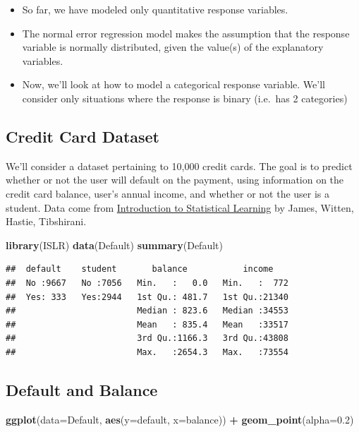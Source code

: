 \documentclass[]{book}
\newenvironment{Shaded}{\begin{snugshade}}{\end{snugshade}}
\newcommand{\KeywordTok}[1]{\textcolor[rgb]{0.13,0.29,0.53}{\textbf{#1}}}
\newcommand{\DataTypeTok}[1]{\textcolor[rgb]{0.13,0.29,0.53}{#1}}
\newcommand{\FloatTok}[1]{\textcolor[rgb]{0.00,0.00,0.81}{#1}}
\newcommand{\StringTok}[1]{\textcolor[rgb]{0.31,0.60,0.02}{#1}}
\newcommand{\OperatorTok}[1]{\textcolor[rgb]{0.81,0.36,0.00}{\textbf{#1}}}
\newcommand{\NormalTok}[1]{#1}
\begin{document}
\begin{itemize}
\item
  So far, we have modeled only quantitative response variables.
\item
  The normal error regression model makes the assumption that the
  response variable is normally distributed, given the value(s) of the
  explanatory variables.
\item
  Now, we'll look at how to model a categorical response variable. We'll
  consider only situations where the response is binary (i.e.~has 2
  categories)
\end{itemize}

\subsection{Credit Card Dataset}\label{credit-card-dataset}

We'll consider a dataset pertaining to 10,000 credit cards. The goal is
to predict whether or not the user will default on the payment, using
information on the credit card balance, user's annual income, and
whether or not the user is a student. Data come from
\href{http://www-bcf.usc.edu/~gareth/ISL/data.html}{Introduction to
Statistical Learning} by James, Witten, Hastie, Tibshirani.

\begin{Shaded}
\begin{Highlighting}[]
\KeywordTok{library}\NormalTok{(ISLR)}
\KeywordTok{data}\NormalTok{(Default)}
\KeywordTok{summary}\NormalTok{(Default)}
\end{Highlighting}
\end{Shaded}

\begin{verbatim}
##  default    student       balance           income     
##  No :9667   No :7056   Min.   :   0.0   Min.   :  772  
##  Yes: 333   Yes:2944   1st Qu.: 481.7   1st Qu.:21340  
##                        Median : 823.6   Median :34553  
##                        Mean   : 835.4   Mean   :33517  
##                        3rd Qu.:1166.3   3rd Qu.:43808  
##                        Max.   :2654.3   Max.   :73554
\end{verbatim}

\subsection{Default and Balance}\label{default-and-balance}

\begin{Shaded}
\begin{Highlighting}[]
\KeywordTok{ggplot}\NormalTok{(}\DataTypeTok{data=}\NormalTok{Default, }\KeywordTok{aes}\NormalTok{(}\DataTypeTok{y=}\NormalTok{default, }\DataTypeTok{x=}\NormalTok{balance)) }\OperatorTok{+}\StringTok{ }\KeywordTok{geom_point}\NormalTok{(}\DataTypeTok{alpha=}\FloatTok{0.2}\NormalTok{) }
\end{Highlighting}
\end{Shaded}
\end{document}
